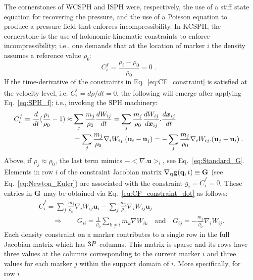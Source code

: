 The cornerstones of WCSPH and ISPH were, respectively, the use of a stiff state equation for recovering the pressure, and the use of a Poisson equation to produce a pressure field that enforces incompressibility. In KCSPH, the cornerstone is the use of holonomic kinematic constraints to enforce incompressibility; i.e., one demands that at the location of marker $i$ the density assumes a reference value $\rho_0$:
\begin{equation} \label{eq:CF_constraint}
C^f_i = \frac{\rho_i-\rho_0}{\rho_0} = 0\;.
\end{equation}
\noindent If the time-derivative of the constraints in Eq.~\ref{eq:CF_constraint} is satisfied at the velocity level, i.e.  $\dot{C}^f_i=d\rho/dt=0$, the following will emerge after applying Eq.~\ref{eq:SPH_f}; i.e., invoking the SPH machinery:
\begin{align} \label{eq:CF_constraint_dot}
\dot{C}^f_i =  \frac{d}{dt}(\frac{\rho_i}{\rho_0} -1) \approx &  \sum_j \frac{m_j}{\rho_0} \frac{dW_{ij}}{dt} =  \sum_j \frac{m_j}{\rho_0} \frac{d W_{ij}}{d \boldsymbol{x}_{ij}}. \frac{d \boldsymbol{x}_{ij}}{dt} \nonumber\\
&=\sum_j \frac{m_j}{\rho_0} \nabla_i W_{ij}. (\textbf{u}_i-\textbf{u}_j) = - \sum_j \frac{m_j}{\rho_0} \nabla_i W_{ij}. (\textbf{u}_j-\textbf{u}_i) \; .
\end{align}
\noindent
Above, if $\rho_j\approx \rho_0$, the last term mimics $- <\nabla. \textbf{u}>_i$, see Eq.~\ref{eq:Standard_G}. Elements in row $i$ of the constraint Jacobian matrix $\nabla_{\bf q} {\bf g}({\bf q},t)\equiv {\bf G}$ (see Eq.~\ref{eq:Newton_Euler}) are associated with the constraint $ g_i=\dot{C}^f_i=0$. These entries in ${\bf G}$ may be obtained via Eq.~\ref{eq:CF_constraint_dot} as follows:
\begin{align} \label{eq:CF_constraint_Jac}
&\dot{C}^f_i =  \sum_j \frac{m_j}{\rho_0} \nabla_i W_{ij} \textbf{u}_i - \sum_j \frac{m_j}{\rho_0} \nabla_i W_{ij} \textbf{u}_j \; \nonumber\\
& \qquad \Rightarrow \qquad
{G}_{ii} = \frac{1}{\rho_0}\sum_{k \ne i} m_k \nabla W_{ik} \quad \mbox{and} \quad 
{G}_{ij} =-\frac{m_j}{\rho_0}\nabla_i W_{ij}.
\end{align}
\noindent
Each density constraint on a marker contributes to a single row in the full Jacobian matrix which has $3P$ columns. This matrix is sparse and its rows have three values at the columns corresponding to the current marker $i$ and three values for each marker $j$ within the support domain of $i$. More specifically, for row $i$
